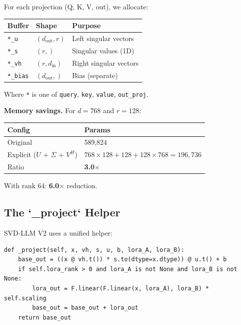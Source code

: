 For each projection (Q, K, V, out), we allocate:

\begin{table}[H]
\centering
\small
\begin{tabular}{lll}
\toprule
\textbf{Buffer} & \textbf{Shape} & \textbf{Purpose} \\
\midrule
\texttt{*\_u} & $(d_\text{out}, r)$ & Left singular vectors \\
\texttt{*\_s} & $(r,)$ & Singular values (1D) \\
\texttt{*\_vh} & $(r, d_\text{in})$ & Right singular vectors \\
\texttt{*\_bias} & $(d_\text{out},)$ & Bias (separate) \\
\bottomrule
\end{tabular}
\end{table}

Where \texttt{*} is one of \texttt{query}, \texttt{key}, \texttt{value}, \texttt{out\_proj}.

\textbf{Memory savings.} For $d = 768$ and $r = 128$:

\begin{table}[H]
\centering
\small
\begin{tabular}{ll}
\toprule
\textbf{Config} & \textbf{Params} \\
\midrule
Original & 589,824 \\
Explicit ($U$ + $\Sigma$ + $V^H$) & $768 \times 128 + 128 + 128 \times 768 = 196{,}736$ \\
Ratio & \textbf{3.0$\times$} \\
\bottomrule
\end{tabular}
\end{table}

With rank 64: \textbf{6.0$\times$} reduction.

\subsection{The `\_project` Helper}

SVD-LLM V2 uses a unified helper:

\begin{lstlisting}
def _project(self, x, vh, s, u, b, lora_A, lora_B):
    base_out = ((x @ vh.t()) * s.to(dtype=x.dtype)) @ u.t() + b
    if self.lora_rank > 0 and lora_A is not None and lora_B is not None:
        lora_out = F.linear(F.linear(x, lora_A), lora_B) * self.scaling
        base_out = base_out + lora_out
    return base_out
\end{lstlisting}

